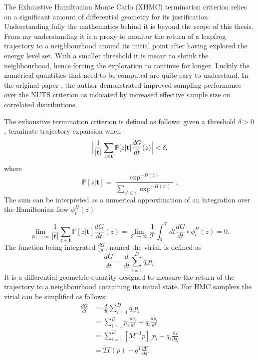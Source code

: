 \documentclass[12pt]{report}
\begin{document}
The Exhaustive Hamiltonian Monte Carlo (XHMC) termination criterion relies on a significant amount of differential geometry for its justification\cite{betancourt2016identifying}. Understanding fully the mathematics behind it is beyond the scope of this thesis. From my understanding it is a proxy to monitor the return of a leapfrog trajectory to a neighbourhood around its initial point after having explored the energy level set. With a smaller threshold it is meant to shrink the neighbourhood, hence forcing the exploration to continue for longer. Luckily the numerical quantities that need to be computed are quite easy to understand. In the original paper \cite{betancourt2016identifying}, the author demonstrated improved sampling performance over the NUTS criterion as indicated by increased effective sample size on correlated distributions. 

The exhaustive termination criterion is defined as follows: given a threshold $\delta > 0$, terminate trajectory expansion when 
\[  \Bigl |\frac{1}{|\mathbf{t}|} \sum_{z \in \mathbf{t}} \mathbb{P}[z | \mathbf{t}] \frac{dG}{dt}(z) \Bigr | < \delta, \]
where 
\[ \mathbb{P}[z| \mathbf{t}] = \frac{\exp^{-H(z)}}{\sum_{z' \in \mathbf{t}} \exp^{-H(z')}}. \]
The sum can be interpreted as a numerical approximation of an integration over the Hamiltonian flow $\phi_{t}^H(z)$

\[ \lim_{|\mathbf{t}| \rightarrow \infty} \frac{1}{|\mathbf{t}|} \sum_{z \in \mathbf{t}} \mathbb{P}[z | \mathbf{t}] \frac{dG}{dt}(z)  = \lim_{\mathcal{T} \rightarrow \infty} \frac{1}{\mathcal{T}} \int_0^\mathcal{T} dt \frac{dG}{dt} \circ \phi_{t}^H(z) = 0. \]
The function being integrated $\frac{dG}{dt}$, named the virial, is defined as 
\[  \frac{dG}{dt} = \frac{d}{dt}\sum_{i=1}^D q_i p_i.\]
It is a differential-geometric 
quantity designed to measure the return of the trajectory to a neighbourhood containing its initial state. For HMC samplers the virial can be simplified as follows:
\begin{align*}
 \frac{dG}{dt} &= \frac{d}{dt}\sum_{i=1}^D q_i p_i \\
 &= \sum_{i=1}^D p_i \frac{dq_i}{dt} + q_i \frac{dp_i}{dt} \\
 &= \sum_{i=1}^D [M^{-1}p]_i p_i - q_i \frac{\partial V}{\partial q_i} \\
 &= 2 T(p) - q ^T \frac{\partial V}{\partial q}.\\
\end{align*}
\SetAlFnt{\small}
\end{document}
